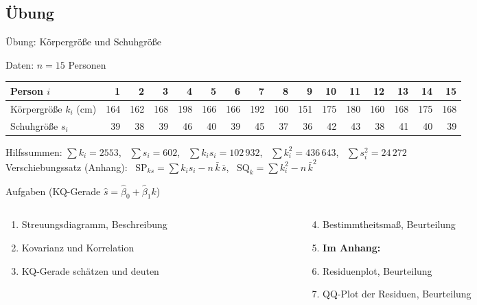 \documentclass[aspectratio=169,11pt]{beamer}
\newcommand{\SQk}{\text{SQ}_k}
\newcommand{\SPks}{\text{SP}_{ks}}
\begin{document}
\subsection*{Übung}

\begin{frame}{Übung: Körpergröße und Schuhgröße}
  \begin{block}{Daten: $n = 15$ Personen}
    {\centering
      \scriptsize
      \renewcommand{\arraystretch}{1.0}
      \setlength{\tabcolsep}{3.4pt}
      \begin{tabular}{l*{15}{r}}
        \toprule
        Person $i$         & 1 & 2 & 3 & 4 & 5 & 6 & 7 & 8 & 9 & 10 & 11 & 12 & 13 & 14 & 15 \\
        \midrule
        Körpergröße $k_i$ (cm) & 164 & 162 & 168 & 198 & 166 & 166 & 192 & 160 & 151 & 175 & 180 & 160 & 168 & 175 & 168 \\
        Schuhgröße $s_i$       & 39 & 38 & 39 & 46 & 40 & 39 & 45 & 37 & 36 & 42 & 43 & 38 & 41 & 40 & 39 \\
        \bottomrule
      \end{tabular}\par}
    \smallskip
    \footnotesize Hilfssummen: $\sum k_i = 2553$, \ $\sum s_i = 602$, \
    $\sum k_i s_i = 102\,932$, \ $\sum k_i^{2} = 436\,643$, \ $\sum s_i^{2} = 24\,272$\\
    Verschiebungssatz (Anhang): \ $\SPks = \sum k_i s_i - n\,\bar{k}\,\bar{s}$, \
    $\SQk = \sum k_i^{2} - n\,\bar{k}^{2}$
  \end{block}

  \begin{exampleblock}{Aufgaben (KQ-Gerade $\hat{s} = \hat{\beta}_0 + \hat{\beta}_1 k$)}
    \begin{columns}[T]
      \begin{column}{0.48\textwidth}
        \begin{enumerate}
          \item Streuungsdiagramm, Beschreibung
          \item Kovarianz und Korrelation
          \item KQ-Gerade schätzen und deuten
        \end{enumerate}
      \end{column}
      \begin{column}{0.5\textwidth}
        \begin{enumerate}
          \setcounter{enumi}{3}
          \item Bestimmtheitsmaß, Beurteilung
          \item[] \textbf{Im Anhang:}
          \item Residuenplot, Beurteilung
          \item QQ-Plot der Residuen, Beurteilung
        \end{enumerate}
      \end{column}
    \end{columns}
  \end{exampleblock}
\end{frame}
\end{document}
